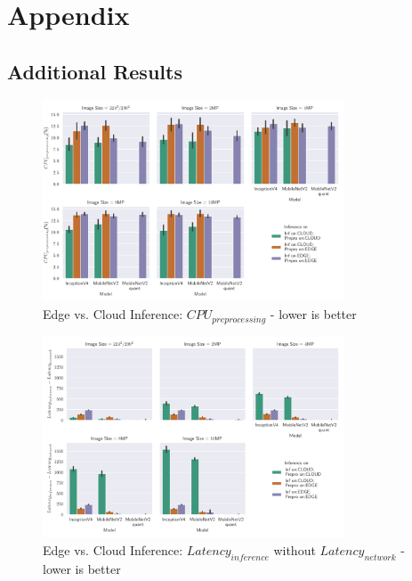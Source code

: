 \appendix
\chapter{Appendix}
\section{Additional Results}

\begin{figure}[H]
\centering
\includegraphics[width=0.8\textwidth]{./Bilder/single_plots/edge_vs_cloud_plots/Edge_vs_Cloud_Inference_Preprocessing_CPU.pdf}
\caption{Edge vs. Cloud Inference: $CPU_{preprocessing}$ - lower is better}
\label{fig:CloudEdgePreproCPU}
\end{figure}

\begin{figure}[H]
\centering
\includegraphics[width=0.8\textwidth]{./Bilder/single_plots/edge_vs_cloud_plots/Edge_vs_Cloud_Inference_Inference_Latencies_WITHOUT_NETWORK.pdf}
\caption{Edge vs. Cloud Inference: $Latency_{inference}$ without $Latency_{network}$ - lower is better}
\label{fig:CloudEdgeInfLatWONetwork}
\end{figure}







